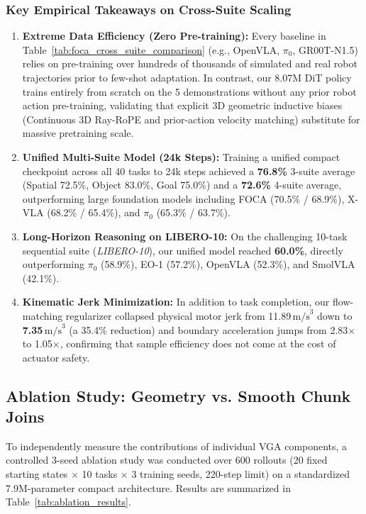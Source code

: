 \subsubsection{Key Empirical Takeaways on Cross-Suite Scaling}
\begin{enumerate}
    \item \textbf{Extreme Data Efficiency (Zero Pre-training):} Every baseline in Table~\ref{tab:foca_cross_suite_comparison} (e.g., OpenVLA, $\pi_0$, GR00T-N1.5) relies on pre-training over hundreds of thousands of simulated and real robot trajectories prior to few-shot adaptation. In contrast, our 8.07M DiT policy trains entirely from scratch on the 5 demonstrations without any prior robot action pre-training, validating that explicit 3D geometric inductive biases (Continuous 3D Ray-RoPE and prior-action velocity matching) substitute for massive pretraining scale.
    \item \textbf{Unified Multi-Suite Model (24k Steps):} Training a unified compact checkpoint across all 40 tasks to 24k steps achieved a \textbf{76.8\%} 3-suite average (Spatial 72.5\%, Object 83.0\%, Goal 75.0\%) and a \textbf{72.6\%} 4-suite average, outperforming large foundation models including FOCA (70.5\% / 68.9\%), X-VLA (68.2\% / 65.4\%), and $\pi_0$ (65.3\% / 63.7\%).
    \item \textbf{Long-Horizon Reasoning on LIBERO-10:} On the challenging 10-task sequential suite (\textit{LIBERO-10}), our unified model reached \textbf{60.0\%}, directly outperforming $\pi_0$ (58.9\%), EO-1 (57.2\%), OpenVLA (52.3\%), and SmolVLA (42.1\%).
    \item \textbf{Kinematic Jerk Minimization:} In addition to task completion, our flow-matching regularizer collapsed physical motor jerk from 11.89\,$\text{m/s}^3$ down to \textbf{7.35\,$\text{m/s}^3$} (a 35.4\% reduction) and boundary acceleration jumps from 2.83$\times$ to 1.05$\times$, confirming that sample efficiency does not come at the cost of actuator safety.
\end{enumerate}

\subsection{Ablation Study: Geometry vs. Smooth Chunk Joins}

To independently measure the contributions of individual VGA components, a controlled 3-seed ablation study was conducted over 600 rollouts (20 fixed starting states $\times$ 10 tasks $\times$ 3 training seeds, 220-step limit) on a standardized 7.9M-parameter compact architecture. Results are summarized in Table~\ref{tab:ablation_results}.


